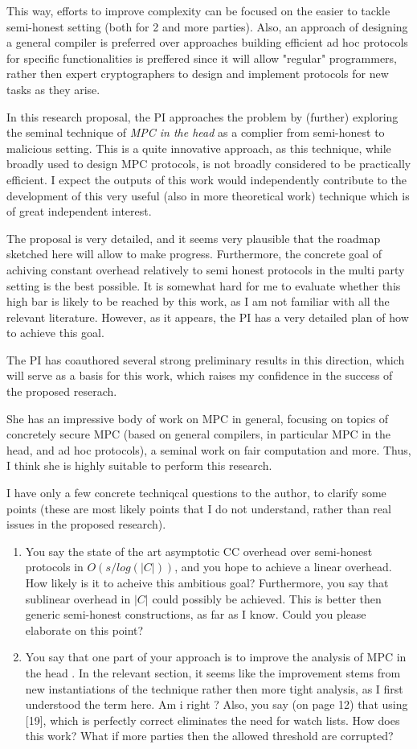 \documentclass[a4paper]{article}
\begin{document}
This way, efforts to improve complexity can be focused on the easier to tackle semi-honest setting (both for 2 and more parties). 
Also, an approach of designing a general compiler is preferred over approaches building efficient ad hoc protocols for specific functionalities is preffered since it will allow "regular" programmers, rather then expert cryptographers to design and implement protocols for new tasks as they arise.

In this research proposal, the PI approaches the problem
by (further) exploring the seminal technique of \emph{MPC in the head} as a complier from semi-honest to malicious setting.
This is a quite innovative approach, as this technique, while broadly used to design MPC protocols, is not broadly considered to be practically efficient. I expect the outputs of this work would independently contribute to the development of this very useful (also in more theoretical work) technique which is of great independent interest.

The proposal is very detailed, and it seems very plausible that the roadmap sketched here will allow to make progress. Furthermore, the concrete goal of achiving constant overhead relatively to semi honest protocols in the multi party setting is the best possible. It is somewhat hard for me to evaluate whether this high bar is likely to be reached by this work, as I am not familiar with all the relevant literature. However, as it appears, the PI has a very detailed plan of how to achieve this goal.

The PI has coauthored several strong preliminary results in this direction, which will serve as a basis for this work, which raises my confidence in the success of the proposed reserach.

She has an impressive body of work on MPC in general, focusing on topics of concretely secure MPC (based on general compilers, in particular MPC in the head, and ad hoc protocols), a seminal work on fair computation and more. Thus, I think she is highly suitable to perform this research.

I have only a few concrete techniqcal questions to the author, to clarify some points (these are most likely points that I do not understand, rather than real issues in the proposed research).
\begin{enumerate}
\item You say the state of the art asymptotic CC overhead over semi-honest protocols in $O(s/log(|C|))$, and you hope to achieve a linear overhead. How likely is it to acheive this ambitious goal?
Furthermore, you say that sublinear overhead in $|C|$ could possibly be achieved. This is better then generic semi-honest constructions, as far as I know. Could you please elaborate on this point?
\item You say that one part of your approach is to improve the analysis of MPC in the head . In the relevant section, it seems like the improvement stems from new instantiations of the technique rather then more tight analysis, as I first understood the term here. Am i right ?
Also, you say (on page 12) that using [19], which is perfectly correct eliminates the need for watch lists. How does this work? What if more parties then the allowed threshold are corrupted?	
\end{enumerate}
\end{document}
